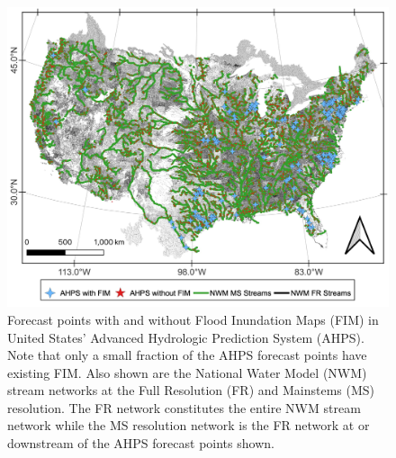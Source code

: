 \documentclass[draft]{dependencies/agujournal2019}
\begin{document}
\begin{figure}[H]
\centering
\includegraphics[scale=0.75]{figures/forecast_points.jpg}
\caption{Forecast points with and without Flood Inundation Maps (FIM) in United States' Advanced Hydrologic Prediction System (AHPS).
Note that only a small fraction of the AHPS forecast points have existing FIM.
Also shown are the National Water Model (NWM) stream networks at the Full Resolution (FR) and Mainstems (MS) resolution.
The FR network constitutes the entire NWM stream network while the MS resolution network is the FR network at or downstream of the AHPS forecast points shown.
}
\label{fig:forecast_points}
\end{figure}
%
\end{document}
